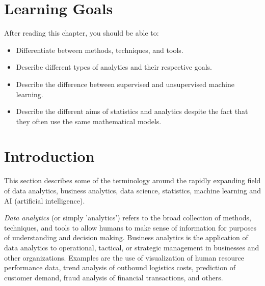 %
%


\section*{Learning Goals}

After reading this chapter, you should be able to:

\begin{itemize}
   \item Differentiate between methods, techniques, and tools.
   \item Describe different types of analytics and their respective goals.
   \item Describe the difference between supervised and unsupervised machine learning.
   \item Describe the different aims of statistics and analytics despite the fact that they often use the same mathematical models.
\end{itemize}

\section{Introduction}

This section describes some of the terminology around the rapidly expanding field of data analytics, business analytics, data science, statistics, machine learning and AI (artificial intelligence). 

\emph{Data analytics} (or simply 'analytics') refers to the broad collection of methods, techniques, and tools to allow humans to make sense of information for purposes of understanding and decision making. Business analytics is the application of data analytics to operational, tactical, or strategic management in businesses and other organizations. Examples are the use of visualization of human resource performance data, trend analysis of outbound logistics costs, prediction of customer demand, fraud analysis of financial transactions, and others.

